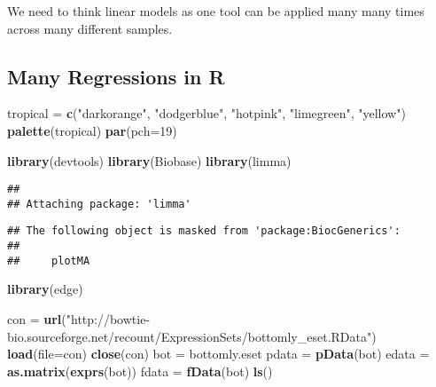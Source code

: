 \documentclass[]{article}
\newenvironment{Shaded}{\begin{snugshade}}{\end{snugshade}}
\newcommand{\KeywordTok}[1]{\textcolor[rgb]{0.13,0.29,0.53}{\textbf{#1}}}
\newcommand{\DataTypeTok}[1]{\textcolor[rgb]{0.13,0.29,0.53}{#1}}
\newcommand{\DecValTok}[1]{\textcolor[rgb]{0.00,0.00,0.81}{#1}}
\newcommand{\StringTok}[1]{\textcolor[rgb]{0.31,0.60,0.02}{#1}}
\newcommand{\NormalTok}[1]{#1}
\begin{document}
We need to think linear models as one tool can be applied many many
times across many different samples.

\subsection{Many Regressions in R}\label{many-regressions-in-r}

\begin{Shaded}
\begin{Highlighting}[]
\NormalTok{tropical =}\StringTok{ }\KeywordTok{c}\NormalTok{(}\StringTok{"darkorange"}\NormalTok{, }\StringTok{"dodgerblue"}\NormalTok{, }\StringTok{"hotpink"}\NormalTok{, }\StringTok{"limegreen"}\NormalTok{, }\StringTok{"yellow"}\NormalTok{)}
\KeywordTok{palette}\NormalTok{(tropical)}
\KeywordTok{par}\NormalTok{(}\DataTypeTok{pch=}\DecValTok{19}\NormalTok{)}

\KeywordTok{library}\NormalTok{(devtools)}
\KeywordTok{library}\NormalTok{(Biobase)}
\KeywordTok{library}\NormalTok{(limma)}
\end{Highlighting}
\end{Shaded}

\begin{verbatim}
## 
## Attaching package: 'limma'
\end{verbatim}

\begin{verbatim}
## The following object is masked from 'package:BiocGenerics':
## 
##     plotMA
\end{verbatim}

\begin{Shaded}
\begin{Highlighting}[]
\KeywordTok{library}\NormalTok{(edge)}

\NormalTok{con =}\StringTok{ }\KeywordTok{url}\NormalTok{(}\StringTok{"http://bowtie-bio.sourceforge.net/recount/ExpressionSets/bottomly_eset.RData"}\NormalTok{)}
\KeywordTok{load}\NormalTok{(}\DataTypeTok{file=}\NormalTok{con)}
\KeywordTok{close}\NormalTok{(con)}
\NormalTok{bot =}\StringTok{ }\NormalTok{bottomly.eset}
\NormalTok{pdata =}\StringTok{ }\KeywordTok{pData}\NormalTok{(bot)}
\NormalTok{edata =}\StringTok{ }\KeywordTok{as.matrix}\NormalTok{(}\KeywordTok{exprs}\NormalTok{(bot))}
\NormalTok{fdata =}\StringTok{ }\KeywordTok{fData}\NormalTok{(bot)}
\KeywordTok{ls}\NormalTok{()}
\end{Highlighting}
\end{Shaded}
\end{document}
